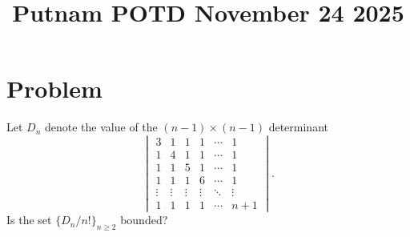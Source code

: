 \documentclass[amssymb,pra,12pt,aps,notitlepage]{revtex4-1}
\begin{document}
\title{Putnam POTD November 24 2025}
\maketitle

\section{Problem}
Let $D_n$ denote the value of the $(n-1) \times (n-1)$ determinant
\[
\begin{vmatrix}
3 & 1 & 1 & 1 & \cdots & 1 \\
1 & 4 & 1 & 1 & \cdots & 1 \\
1 & 1 & 5 & 1 & \cdots & 1 \\
1 & 1 & 1 & 6 & \cdots & 1 \\
\vdots & \vdots & \vdots & \vdots & \ddots & \vdots \\
1 & 1 & 1 & 1 & \cdots & n+1
\end{vmatrix}.
\]
Is the set $\{D_n/n!\}_{n \ge 2}$ bounded?
\end{document}
